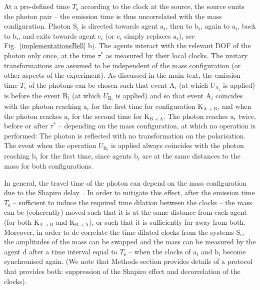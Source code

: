 \documentclass[a4paper,11pt]{article}
\begin{document}
At a pre-defined time $T_\mathrm{s}$ according to the clock at the source, the source emits the photon pair -- the emission time is thus uncorrelated with the mass configuration. Photon $\mathrm S_i$ is directed towards agent $\mathrm a_i$, then to $\mathrm b_i$, again to $\mathrm a_i$, back to $\mathrm b_i$,  and exits towards agent $\mathrm c_i$ (or $\mathrm c_i$ simply replaces $\mathrm a_i$), see Fig.\ \ref{implementationsBell} b).
{The agents interact with the relevant DOF of the photon only once, at the time $\tau^*$ as measured by their local clocks.  The unitary transformations are assumed to be independent of the mass configuration (or other aspects of the experiment). As discussed in the main text, the emission time  $T_\mathrm{s}$ of the photons  can be chosen such that event $\mathrm A_i$ (at which  $U_{\mathrm A_i}$ is applied) is before the event $\mathrm B_i$ (at which $U_{\mathrm B_i}$ is applied) and so that event $\mathrm A_i$ coincides with the photon reaching $\mathrm a_i$ for the first time for configuration $\mathrm{K_{A\prec B}}$, and when the photon reaches $\mathrm a_i$ for the second time for $\mathrm{K_{B\prec A}}$. The photon reaches $\mathrm a_i$  twice, before or after $\tau^*$ -- depending on the mass configuration, at which no operation is performed: The photon is reflected with no transformation on the polarisation. The event when the operation $U_{\mathrm B_i}$ is applied always coincides with the photon reaching $\mathrm b_i$ for the first time, since agents $\mathrm b_i$ are at the same distances to the mass for both configurations.}

In general, the travel time of the photon  can depend on the mass configuration due to the Shapiro delay~\cite{ref:Shapiro1964, ref:Shapiro1971}. 
In order to {mitigate} this effect, after the emission time $T_\mathrm{s}$ -- sufficient  to induce the required time dilation between the clocks  -- the mass can be (coherently) moved such that it is at the same distance from each agent (for both $\mathrm{K_{A\prec B}}$ and $\mathrm{K_{B\prec A}}$), or such that it is sufficiently far away from both.
Moreover, in order to de-correlate the time-dilated clocks from the systems $\mathrm S_i$, the amplitudes of the mass can be swapped and the mass can be measured by the agent $\mathrm d$ after a time interval equal to $T_\mathrm{s}$ -- when the clocks of $\mathrm a_i$ and  $\mathrm b_i$ become synchronised again. (We note that Methods section provides details of a protocol that provides both: suppression of the Shapiro effect and decorrelation of the clocks).
\end{document}
